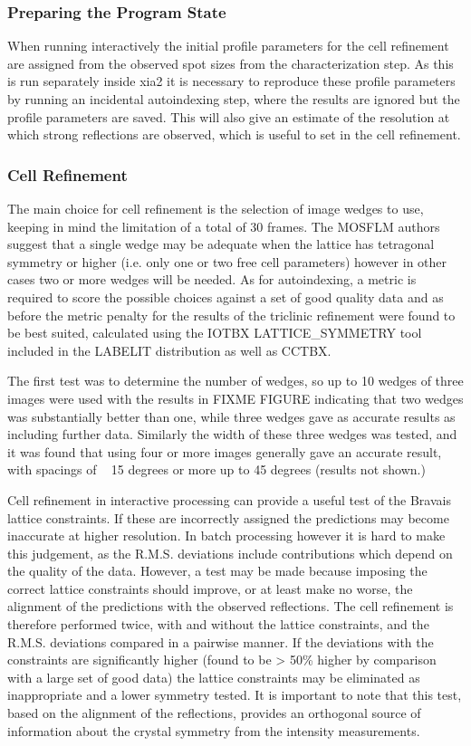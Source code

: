 \documentclass[a4paper, 11pt]{article}
\begin{document}
\subsubsection{Preparing the Program State}

When running interactively the initial profile parameters for the cell refinement are assigned from the observed spot sizes from the characterization step. As this is run separately inside xia2 it is necessary to reproduce these profile parameters by running an incidental autoindexing step, where the results are ignored but the profile parameters are saved. This will also give an estimate of the resolution at which strong reflections are observed, which is useful to set in the cell refinement.

\subsubsection{Cell Refinement}

The main choice for cell refinement is the selection of image wedges to use, keeping in mind the limitation of a total of 30 frames. The MOSFLM authors suggest that a single wedge may be adequate when the lattice has tetragonal symmetry or higher (i.e. only one or two free cell parameters) however in other cases two or more wedges will be needed. As for autoindexing, a metric is required to score the possible choices against a set of good quality data and as before the metric penalty for the results of the triclinic refinement were found to be best suited, calculated using the IOTBX LATTICE\_SYMMETRY tool included in the LABELIT distribution as well as CCTBX. 

The first test was to determine the number of wedges, so up to 10 wedges of three images were used with the results in FIXME FIGURE indicating that two wedges was substantially better than one, while three wedges gave as accurate results as including further data. Similarly the width of these three wedges was tested, and it was found that using four or more images generally gave an accurate result, with spacings of ~ 15 degrees or more up to 45 degrees (results not shown.) 

Cell refinement in interactive processing can provide a useful test of the Bravais lattice constraints. If these are incorrectly assigned the predictions may become inaccurate at higher resolution. In batch processing however it is hard to make this judgement, as the R.M.S. deviations include contributions which depend on the quality of the data. However, a test may be made because imposing the correct lattice constraints should improve, or at least make no worse, the alignment of the predictions with the observed reflections. The cell refinement is therefore performed twice, with and without the lattice constraints, and the R.M.S. deviations compared in a pairwise manner. If the deviations with the constraints are significantly higher (found to be > 50\% higher by comparison with a large set of good data) the lattice constraints may be eliminated as inappropriate and a lower symmetry tested. It is important to note that this test, based on the alignment of the reflections, provides an orthogonal source of information about the crystal symmetry from the intensity measurements.
\end{document}
